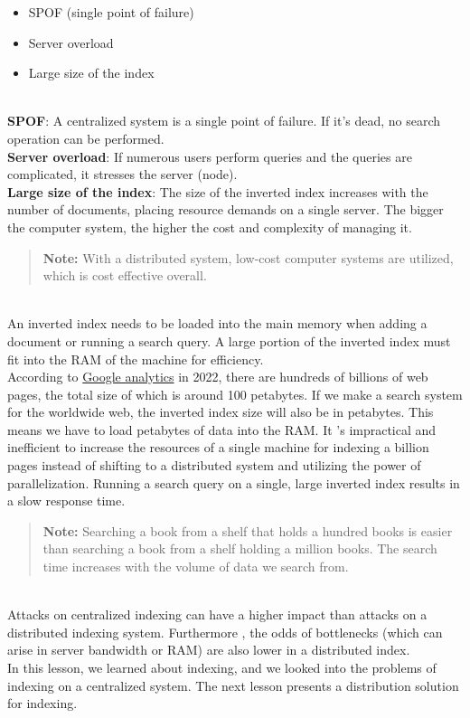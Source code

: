 \begin{itemize}
\item
\protect{}\label{U-7IMLvL2i37g0MzC0tiA}
SPOF (single point of failure)
\item
\protect{}\label{ahACln_8vA7mjggkOh049}
Server overload
\item
\protect{}\label{-5r7AVi4VUMGL2kePgnSK}
Large size of the index
\end{itemize}
\\
\textbf{SPOF}: A centralized system is a single point of failure. If it's dead, no search operation can be performed.
\\
\textbf{Server overload}: If numerous users perform queries and the queries are complicated, it stresses the server (node).
\\
\textbf{Large size of the index}: The size of the inverted index increases with the number of documents, placing resource demands on a single server. The bigger the computer system, the higher the cost and complexity of managing it.
\begin{quote}
\textbf{Note:} With a distributed system, low-cost computer systems are utilized, which is cost effective overall.
\end{quote}
\\
An inverted index needs to be loaded into the main memory when adding a document or running a search query. A large portion of the inverted index must fit into the RAM of the machine for efficiency.
\\
According to \href{https://www.google.com/search/howsearchworks/crawling-indexing/}{Google analytics} in 2022, there are hundreds of billions of web pages, the total size of which is around 100 petabytes. If we make a search system for the worldwide web, the inverted index size will also be in petabytes. This means we have to load petabytes of data into the RAM. It 's impractical and inefficient to increase the resources of a single machine for indexing a billion pages instead of shifting to a distributed system and utilizing the power of parallelization. Running a search query on a single, large inverted index results in a slow response time.
\begin{quote}
\textbf{Note:} Searching a book from a shelf that holds a hundred books is easier than searching a book from a shelf holding a million books. The search time increases with the volume of data we search from.
\end{quote}
\\
Attacks on centralized indexing can have a higher impact than attacks on a distributed indexing system. Furthermore , the odds of bottlenecks (which can arise in server bandwidth or RAM) are also lower in a distributed index.
\\
In this lesson, we learned about indexing, and we looked into the problems of indexing on a centralized system. The next lesson presents a distribution solution for indexing.

